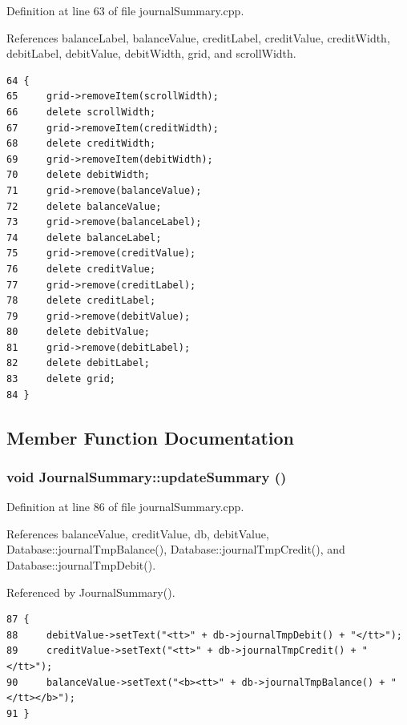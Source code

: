 Definition at line 63 of file journal\-Summary.cpp.

References balance\-Label, balance\-Value, credit\-Label, credit\-Value, credit\-Width, debit\-Label, debit\-Value, debit\-Width, grid, and scroll\-Width.

\footnotesize\begin{verbatim}64 {
65     grid->removeItem(scrollWidth);
66     delete scrollWidth;
67     grid->removeItem(creditWidth);
68     delete creditWidth;
69     grid->removeItem(debitWidth);
70     delete debitWidth;
71     grid->remove(balanceValue);
72     delete balanceValue;
73     grid->remove(balanceLabel);
74     delete balanceLabel;
75     grid->remove(creditValue);
76     delete creditValue;
77     grid->remove(creditLabel);
78     delete creditLabel;
79     grid->remove(debitValue);
80     delete debitValue;
81     grid->remove(debitLabel);
82     delete debitLabel;
83     delete grid;
84 }
\end{verbatim}\normalsize 




\subsection{Member Function Documentation}
\hypertarget{classJournalSummary_k0}{
\subsubsection[updateSummary]{\setlength{\rightskip}{0pt plus 5cm}void Journal\-Summary::update\-Summary ()}}
\label{classJournalSummary_k0}


Definition at line 86 of file journal\-Summary.cpp.

References balance\-Value, credit\-Value, db, debit\-Value, Database::journal\-Tmp\-Balance(), Database::journal\-Tmp\-Credit(), and Database::journal\-Tmp\-Debit().

Referenced by Journal\-Summary().

\footnotesize\begin{verbatim}87 {
88     debitValue->setText("<tt>" + db->journalTmpDebit() + "</tt>");
89     creditValue->setText("<tt>" + db->journalTmpCredit() + "</tt>");
90     balanceValue->setText("<b><tt>" + db->journalTmpBalance() + "</tt></b>");
91 }
\end{verbatim}\normalsize 




